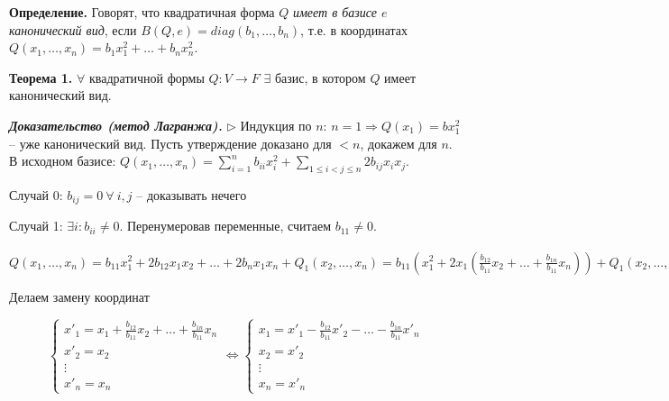\vspace{\baselineskip}
\textbf{Определение.} Говорят, что квадратичная форма $Q$ \textit{имеет в базисе $e$ канонический вид}, если $B(Q, e) = diag(b_1,\dots, b_n)$, т.е. в координатах $Q(x_1, \dots, x_n) = b_1 x_1^2 + \dots + b_n x_n^2$.

\vspace{\baselineskip}
\textbf{Теорема 1.} $\forall$ квадратичной формы $Q: V \rightarrow F$ $\exists$ базис,  в котором $Q$ имеет канонический вид.

\vspace{\baselineskip}
\textbf{\textit{Доказательство (метод Лагранжа).}} $\rhd$ Индукция по $n$: $n=1 \Rightarrow Q(x_1) = b x_1^2$ -- уже канонический вид. Пусть утверждение доказано для $<n$, докажем для $n$. В исходном базисе: $Q(x_1, \dots, x_n) = \sum\limits_{i=1}^n b_{ii} x_i^2 + \sum\limits_{1 \leq i < j \leq n} 2b_{ij} x_i x_j$.

Случай 0: $b_{ij} = 0 \ \forall \ i,j$ -- доказывать нечего

Случай 1: $\exists i : b_{ii} \neq 0$. Перенумеровав переменные, считаем $b_{11} \neq 0$.

$Q(x_1, \dots, x_n) = b_{11} x_1^2 + 2b_{12} x_1 x_2 + \dots + 2b_n x_1 x_n + Q_1(x_2, \dots, x_n) = b_{11}(x_1^2 + 2x_1(\frac{b_{12}}{b_{11}} x_2 + \dots + \frac{b_{1n}}{b_{11}} x_n )) + Q_1(x_2, \dots, x_n) = b_{11} (x_1 + \frac{b{12}}{b_{11}} x_2 + \dots + \frac{b_{1n}}{b_{11}} x_n)^2 - b_{11} (\frac{b_{12}}{b_{11}} x_2 + \dots + \frac{b_{12}}{b_{11}} + \dots + \frac{b_{1n}}{b_{11}} x_n) ^2 + Q_1(x_2, \dots, x_n)$

Делаем замену координат

\begin{equation*}
 \begin{cases}
		x'_1 = x_1 + \frac{b_{12}}{b_{11}} x_2 + \dots + \frac{b_{1n}}{b_{11}} x_n \\
		x'_2 = x_2 \\
        \vdots \\
        x'_n = x_n
	\end{cases} \Leftrightarrow \begin{cases}
		x_1 = x'_1 - \frac{b_{12}}{b_{11}} x'_2 - \dots - \frac{b_{1n}}{b_{11}} x'_n \\
		x_2 = x'_2 \\
        \vdots \\
        x_n = x'_n
	\end{cases}
\end{equation*}

